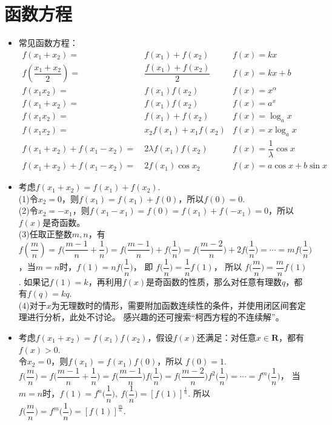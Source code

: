\section{函数方程}
\begin{itemize}[leftmargin=\inteval{\myitemleftmargin}pt,itemsep=
   \inteval{\myitemitempsep}pt,topsep=\inteval{\myitemtopsep}pt]
\item 常见函数方程：
\begin{align*}
    f(x_1+x_2)=&\ f(x_1)+f(x_2)   	& f(x)=kx  \\
    f\left(\dfrac{x_1+x_2}{2}\right) =&\ \dfrac{f(x_1)+f(x_2)}{2}  & f(x)=kx+b \\
    f(x_1x_2)=&\ f(x_1)f(x_2)   	& f(x)=x^{\alpha} \\
    f(x_1+x_2)=&\ f(x_1)f(x_2)   	& f(x)=a^x \\
    f(x_1x_2)=&\ f(x_1)+f(x_2)   	& f(x)=\log_{a}x \\
    f(x_1x_2)=&\ x_2f(x_1)+x_1f(x_2)   	& f(x)=x\log_{a}x \\
    f(x_1+x_2)+f(x_1-x_2)=&\ 2\lambda f(x_1)f(x_2) & f(x)=\dfrac{1}{\lambda}\cos x \\
    f(x_1+x_2)+f(x_1-x_2)=&\ 2f(x_1)\cos x_2	& f(x)=a\cos x+b\sin x   
\end{align*}

\item 考虑$ f(x_1+x_2)=f(x_1)+f(x_2) $. \\
(1)令$ x_2=0 $，则$ f(x_1)=f(x_1)+f(0) $，所以$ f(0)=0 $. \\
(2)令$ x_2=-x_1 $，则$ f(x_1-x_1)=f(0)=f(x_1)+f(-x_1)=0 $，所以$ f(x) $是奇函数。\\
(3)任取正整数$ m,n $，有 $ f(\dfrac{m}{n})=f\Big(\dfrac{m-1}{n}+\dfrac{1}{n}\Big)=
f\Big(\dfrac{m-1}{n}\Big)+f\Big(\dfrac{1}{n}\Big)=
f\Big(\dfrac{m-2}{n}\Big)+2f\Big(\dfrac{1}{n}\Big)=
\cdots =mf\Big(\dfrac{1}{n}\Big)$，当$ m=n $时，$ f(1)=nf\Big(\dfrac{1}{n}\Big) $，
即 $ f\Big(\dfrac{1}{n}\Big)=\dfrac{1}{n}f(1) $，
所以 $f\Big(\dfrac{m}{n}\Big)=\dfrac{m}{n}f(1) $. 
如果记$ f(1)=k $，再利用$ f(x) $是奇函数的性质，那么对任意有理数$ q $，都有$ f(q)=kq $. \\
(4)对于$ x $为无理数时的情形，需要附加函数连续性的条件，并使用闭区间套定理进行分析，此处不讨论。
感兴趣的还可搜索“柯西方程的不连续解”。

\item 考虑$ f(x_1+x_2)=f(x_1)f(x_2) $，假设$ f(x) $还满足：对任意$ x\in 
\textbf{R} $，都有$ f(x)> 0 $. \\ 令$ x_2=0 $，则$ f(x_1)=f(x_1)f(0) $，所以
$ f(0)=1 $. $ f\Big(\dfrac{m}{n}\Big)=f\Big(\dfrac{m-1}{n}+\dfrac{1}{n}\Big)=
f\Big(\dfrac{m-1}{n}\Big)f\Big(\dfrac{1}{n}\Big)=f\Big(\dfrac{m-2}{n}\Big)f^2
\Big(\dfrac{1}{n}\Big)=\cdots =f^m\Big(\dfrac{1}{n}\Big) $，
当$ m=n $时，$ f(1)=f^n\Big(\dfrac{1}{n}\Big),\ f\Big(\dfrac{1}{n}\Big)
=[f(1)]^{\frac{1}{n}} $. 
所以$f\Big(\dfrac{m}{n}\Big)=f^m\Big(\dfrac{1}{n}\Big)=[f(1)]^{\frac{m}{n}} $. 


\end{itemize}
